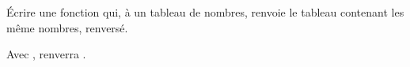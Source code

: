 \question \'Ecrire une fonction  qui, à un tableau  de nombres, renvoie le tableau contenant les même nombres, renversé.

\begin{exemple}
  Avec  ,  renverra \pyv{[7,3,6,2,5]}.
\end{exemple}